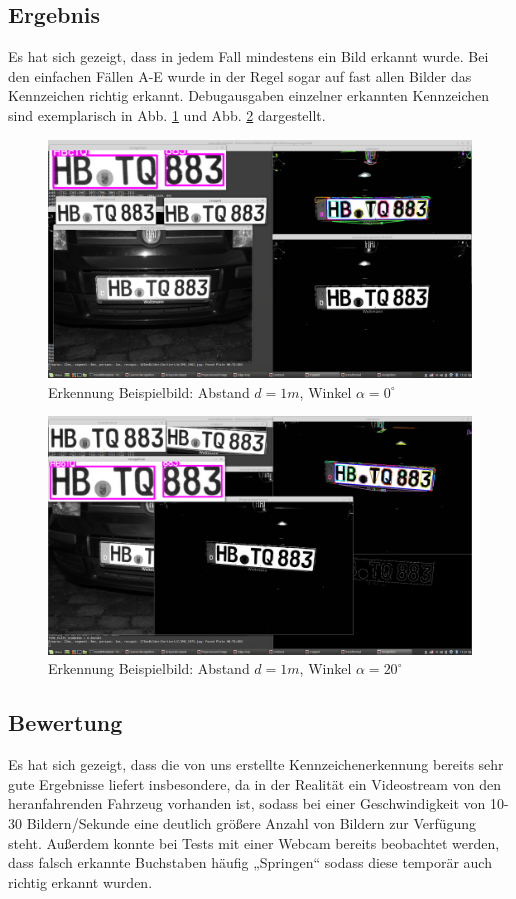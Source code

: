 \documentclass{../Vorlage/sebDenCls}
\begin{document}
\subsection{Ergebnis}
Es hat sich gezeigt, dass in jedem Fall mindestens ein Bild erkannt wurde. Bei den einfachen Fällen A-E wurde in der Regel sogar auf fast allen Bilder das Kennzeichen richtig erkannt.
Debugausgaben einzelner erkannten Kennzeichen sind exemplarisch in Abb. \ref{beispiel} und Abb. \ref{beispiel2} dargestellt.

\begin{figure}[htp]
	\centering 	
	\includegraphics[width=.9\textwidth]{Funktioniert_1962.png} 
	\caption{Erkennung Beispielbild: Abstand $d=1m$, Winkel $\alpha = 0^\circ$ \label{beispiel}}
\end{figure}

\begin{figure}[htp]
	\centering 	
	\includegraphics[width=.9\textwidth]{Funktioniert_1975.png} 
	\caption{Erkennung Beispielbild: Abstand $d=1m$, Winkel $\alpha = 20^\circ$ \label{beispiel2}}
\end{figure}


\subsection{Bewertung}
Es hat sich gezeigt, dass die von uns erstellte Kennzeichenerkennung bereits sehr gute Ergebnisse liefert insbesondere, da in der Realität ein Videostream von den heranfahrenden Fahrzeug vorhanden ist, sodass bei einer Geschwindigkeit von 10-30 Bildern/Sekunde eine deutlich größere Anzahl von Bildern zur Verfügung steht. Außerdem konnte bei Tests mit einer Webcam bereits beobachtet werden, dass falsch erkannte Buchstaben häufig „Springen“ sodass diese temporär auch richtig erkannt wurden. 
\end{document}
